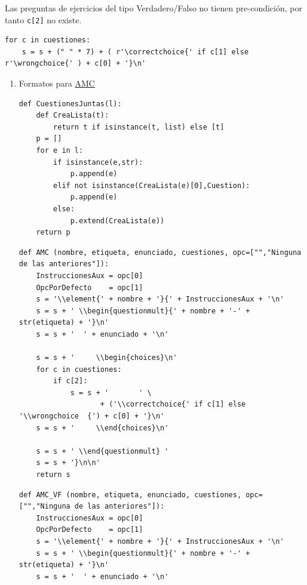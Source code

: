 \documentclass[10pt,a4paper]{report}
\begin{document}
Las preguntas de ejercicios del tipo Verdadero/Falso no tienen pre-condición, por tanto \texttt{c[2]} no existe. 
\begin{verbatim}
for c in cuestiones:
    s = s + (" " * 7) + ( r'\correctchoice{' if c[1] else r'\wrongchoice{' ) + c[0] + '}\n'
\end{verbatim}
\begin{enumerate}
\item Formatos para \href{https://www.auto-multiple-choice.net/}{AMC}
\label{sec:org5f738d3}

\begin{verbatim}
def CuestionesJuntas(l):
    def CreaLista(t):
        return t if isinstance(t, list) else [t]
    p = []
    for e in l:
        if isinstance(e,str):
            p.append(e)
        elif not isinstance(CreaLista(e)[0],Cuestion): 
            p.append(e)
        else:
            p.extend(CreaLista(e))            
    return p
\end{verbatim}

\begin{verbatim}
def AMC (nombre, etiqueta, enunciado, cuestiones, opc=["","Ninguna de las anteriores"]):
    InstruccionesAux = opc[0]
    OpcPorDefecto    = opc[1]
    s = '\\element{' + nombre + '}{' + InstruccionesAux + '\n'
    s = s + ' \\begin{questionmult}{' + nombre + '-' + str(etiqueta) + '}\n'
    s = s + '  ' + enunciado + '\n'

    s = s + '     \\begin{choices}\n'
    for c in cuestiones:
        if c[2]: 
            s = s + '       ' \
                   + ('\\correctchoice{' if c[1] else '\\wrongchoice  {') + c[0] + '}\n'
    s = s + '     \\end{choices}\n'
    
    s = s + ' \\end{questionmult} '
    s = s + '}\n\n'
    return s
\end{verbatim}

\begin{verbatim}
def AMC_VF (nombre, etiqueta, enunciado, cuestiones, opc=["","Ninguna de las anteriores"]):
    InstruccionesAux = opc[0]
    OpcPorDefecto    = opc[1]
    s = '\\element{' + nombre + '}{' + InstruccionesAux + '\n'
    s = s + ' \\begin{questionmult}{' + nombre + '-' + str(etiqueta) + '}\n'
    s = s + '  ' + enunciado + '\n'


\end{verbatim}
\end{enumerate}
\end{document}
